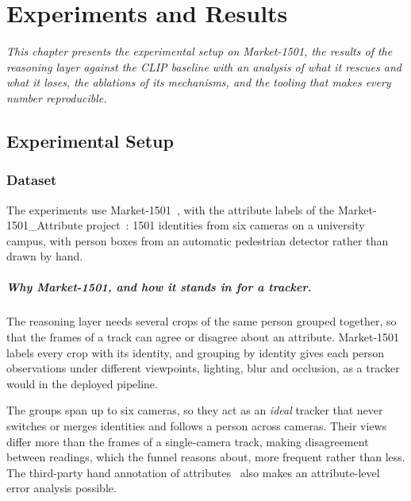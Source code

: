 \chapter{Experiments and Results}
\label{chapter:r-experiments}

\textit{This chapter presents the experimental setup on Market-1501, the results of the reasoning layer against the CLIP baseline with an analysis of what it rescues and what it loses, the ablations of its mechanisms, and the tooling that makes every number reproducible.}

\section{Experimental Setup}

\subsection{Dataset}
\label{sec:r-dataset}
The experiments use Market-1501~\cite{zheng2015market1501}, with the attribute
labels of the Market-1501\_\allowbreak Attribute project~\cite{lin2019market1501attr}:
1501 identities from six cameras on a university campus, with person boxes from an
automatic pedestrian detector rather than drawn by hand.

\paragraph{Why Market-1501, and how it stands in for a tracker.} The reasoning
layer needs several crops of the same person grouped together, so that the frames
of a track can agree or disagree about an attribute. Market-1501 labels every crop
with its identity, and grouping by identity gives each person observations under
different viewpoints, lighting, blur and occlusion, as a tracker would in the
deployed pipeline.

The groups span up to six cameras, so they act as an \emph{ideal} tracker that
never switches or merges identities and follows a person across cameras. Their
views differ more than the frames of a single-camera track, making disagreement
between readings, which the funnel reasons about, more frequent rather than less.
The third-party hand annotation of attributes~\cite{lin2019market1501attr} also
makes an attribute-level error analysis possible.


